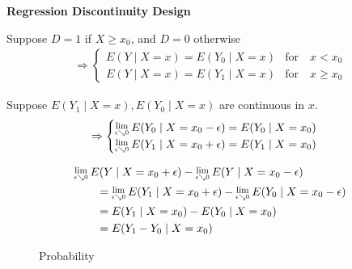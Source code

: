 \begin{frame}\begin{center}
\LARGE\textbf{Regression Discontinuity Design}
\end{center}\end{frame}
\begin{frame}
Suppose $D = 1$ if $X \geq x_0$, and $D=0$ otherwise
\begin{align*}
\Rightarrow\begin{cases}
E(Y \mid X = x) = E(Y_0 \mid X = x) & \text{for}\quad x < x_0     \\
E(Y \mid X = x) = E(Y_1 \mid X = x) & \text{for}\quad x \geq x_0
\end{cases}
\end{align*}

Suppose $E(Y_1\mid X = x), E(Y_0\mid X = x)$ are continuous in $x$.
\begin{align*}
\Rightarrow\begin{cases}
\Lim{\epsilon \searrow 0} E(Y_0\mid X = x_0 - \epsilon) = E(Y_0\mid X = x_0) \\
\Lim{\epsilon \searrow 0} E(Y_1\mid X = x_0 + \epsilon) = E(Y_1\mid X = x_0) \\
\end{cases}
\end{align*}

\end{frame}
\begin{frame}
\begin{align*}
&\Lim{\epsilon \searrow 0} E(Y\mid X = x_0 + \epsilon) - \Lim{\epsilon \searrow 0}E(Y\mid X = x_0 - \epsilon) \\
&\qquad= \Lim{\epsilon \searrow 0} E(Y_1\mid X = x_0 + \epsilon) - \Lim{\epsilon \searrow 0}E(Y_0\mid X = x_0 - \epsilon) \\
&\qquad=E(Y_1\mid X = x_0) - E(Y_0\mid X = x_0) \\
&\qquad=E(Y_1 - Y_0\mid X = x_0)
\end{align*}
\end{frame}
\begin{frame}
\begin{figure}\caption{Probability}
\end{figure}
\end{frame}
